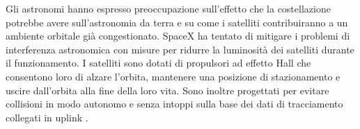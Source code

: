Gli astronomi hanno espresso preoccupazione sull'effetto che la costellazione potrebbe avere sull'astronomia da terra e su come i satelliti contribuiranno a un ambiente orbitale già congestionato.
SpaceX ha tentato di mitigare i problemi di interferenza astronomica con misure per ridurre la luminosità dei satelliti durante il funzionamento.
I satelliti sono dotati di propulsori ad effetto Hall che consentono loro di alzare l'orbita, mantenere una posizione di stazionamento e uscire dall'orbita alla fine della loro vita.
Sono inoltre progettati per evitare collisioni in modo autonomo e senza intoppi sulla base dei dati di tracciamento collegati in uplink \cite{spacex_astronomy_2020}.